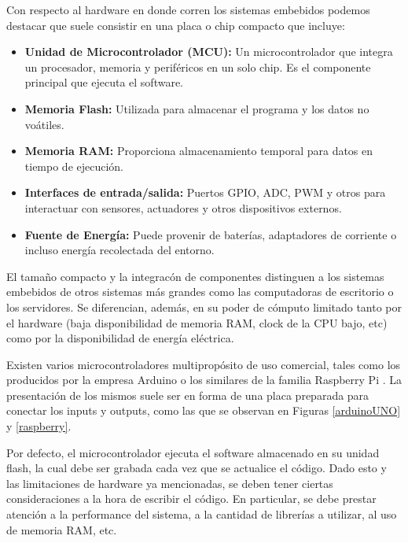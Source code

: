 Con respecto al hardware en donde corren los sistemas embebidos podemos destacar que suele consistir en una placa o chip compacto que incluye:
\begin{itemize}
    \item \textbf{Unidad de Microcontrolador (MCU):} Un microcontrolador que integra un procesador, memoria y perif\'ericos en un solo chip. Es el componente principal que ejecuta el software.
    \item \textbf{Memoria Flash:} Utilizada para almacenar el programa y los datos no voátiles.
    \item \textbf{Memoria RAM:} Proporciona almacenamiento temporal para datos en tiempo de ejecución.
    \item \textbf{Interfaces de entrada/salida:} Puertos \gls{GPIO}, \gls{ADC}, \gls{PWM} y otros para interactuar con sensores, actuadores y otros dispositivos externos.
    \item \textbf{Fuente de Energ\'ia:} Puede provenir de bater\'ias, adaptadores de corriente o incluso energ\'ia recolectada del entorno.
\end{itemize}
El tama\~no compacto y la integracón de componentes distinguen a los sistemas embebidos de otros sistemas más grandes como las computadoras de escritorio o los servidores. Se diferencian, además, en su poder de cómputo limitado tanto por el hardware (baja disponibilidad de memoria RAM, \gls{clock} de la CPU bajo, etc) como por la disponibilidad de energía eléctrica.

Existen varios microcontroladores multipropósito de uso comercial, tales como los producidos por la empresa Arduino \cite{arduinoMicro} o los similares de la familia Raspberry Pi \cite{raspMicro}. La presentación de los mismos suele ser en forma de una placa preparada para conectar los inputs y outputs, como las que se observan en Figuras \ref{arduinoUNO} y \ref{raspberry}.

Por defecto, el microcontrolador ejecuta el software almacenado en su unidad flash, la cual debe ser grabada cada vez que se actualice el código. Dado esto y las limitaciones de hardware ya mencionadas, se deben tener ciertas consideraciones a la hora de escribir el código. En particular, se debe prestar atención a la performance del sistema, a la cantidad de librerías a utilizar, al uso de memoria RAM, etc.

